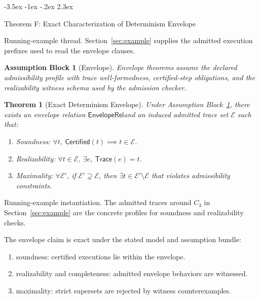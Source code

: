 \documentclass[a4paper,10pt,twocolumn,english]{article}
\makeatletter
\renewcommand{\section}{\@startsection{section}{1}{\z@}%
  {-3.5ex \@plus -1ex \@minus -.2ex}%
  {2.3ex}%
  {\raggedright\normalfont\large\bfseries}}
\numberwithin{equation}{section}
\theoremstyle{paperdef}
\theoremstyle{paperplain}
\newtheorem{theorem}[definition]{Theorem}
\theoremstyle{paperdef}
\theoremstyle{paperremark}
\theoremstyle{paperdef}
\newtheorem{assumptions}[assumption]{Assumption Block}
\newcommand{\EnvelopeRel}{\ensuremath{\mathsf{EnvelopeRel}}}
\makeatother
\begin{document}
\section{Theorem F: Exact Characterization of Determinism Envelope}
\label{sec:theorem-f}

Running-example thread. Section~\ref{sec:example} supplies the admitted
execution prefixes used to read the envelope clauses.

\begin{assumptions}[Envelope]
	\label{assump:p3-envelope}
	Envelope theorems assume the declared admissibility profile with trace well-formedness, certified-step obligations, and the realizability witness schema used by the admission checker.
\end{assumptions}

\begin{theorem}[Exact Determinism Envelope]
	\label{thm:envelope}
	Under Assumption Block~\ref{assump:p3-envelope}, there exists an envelope relation \EnvelopeRel and an induced admitted trace set $\mathcal{E}$ such that:
	\begin{enumerate}
		\item Soundness: $\forall t,\ \mathsf{Certified}(t) \implies t \in \mathcal{E}$.
		\item Realizability: $\forall t \in \mathcal{E},\ \exists e,\ \mathsf{Trace}(e) = t$.
		\item Maximality: $\forall \mathcal{E}'$, if $\mathcal{E}' \supsetneq \mathcal{E}$, then $\exists t \in \mathcal{E}' \setminus \mathcal{E}$ that violates admissibility constraints.
	\end{enumerate}
\end{theorem}

Running-example instantiation. The admitted traces around $C_3$ in
Section~\ref{sec:example} are the concrete profiles for soundness and
realizability checks.

The envelope claim is exact under the stated model and assumption bundle:
\begin{enumerate}
	\item soundness: certified executions lie within the envelope.
	\item realizability and completeness: admitted envelope behaviors are witnessed.
	\item maximality: strict supersets are rejected by witness counterexamples.
\end{enumerate}
\end{document}
